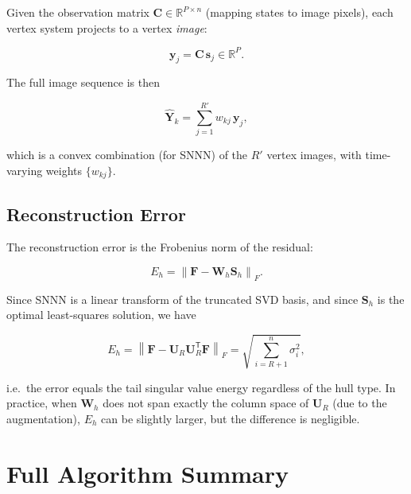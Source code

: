 \documentclass[11pt]{article}
\theoremstyle{definition}
\theoremstyle{plain}
\newcommand{\R}{\mathbb{R}}
\newcommand{\mat}[1]{\mathbf{#1}}
\newcommand{\norm}[1]{\left\|#1\right\|}
\newcommand{\T}{\mathsf{T}}
\begin{document}
Given the observation matrix $\mat{C} \in \R^{P \times n}$ (mapping
states to image pixels), each vertex system projects to a vertex
\emph{image}:

\begin{equation}
  \mat{y}_j = \mat{C}\,\mat{s}_j \in \R^P.
  \label{eq:vertex_image}
\end{equation}

The full image sequence is then

\begin{equation}
  \hat{\mat{Y}}_k = \sum_{j=1}^{R'} w_{kj}\,\mat{y}_j,
  \label{eq:image_recon}
\end{equation}

which is a convex combination (for SNNN) of the $R'$ vertex images,
with time-varying weights $\{w_{kj}\}$.

\subsection{Reconstruction Error}

The reconstruction error is the Frobenius norm of the residual:

\begin{equation}
  E_h = \norm{\mat{F} - \mat{W}_h\mat{S}_h}_F.
  \label{eq:error}
\end{equation}

Since SNNN is a linear transform of the truncated SVD basis, and
since $\mat{S}_h$ is the optimal least-squares solution, we have

\begin{equation}
  E_h = \norm{\mat{F} - \mat{U}_R\mat{U}_R^\T\mat{F}}_F
  = \sqrt{\sum_{i=R+1}^{n}\sigma_i^2},
  \label{eq:error_bound}
\end{equation}

i.e.\ the error equals the tail singular value energy regardless of
the hull type.  In practice, when $\mat{W}_h$ does not span exactly
the column space of $\mat{U}_R$ (due to the augmentation), $E_h$ can
be slightly larger, but the difference is negligible.


\section{Full Algorithm Summary}
\end{document}
